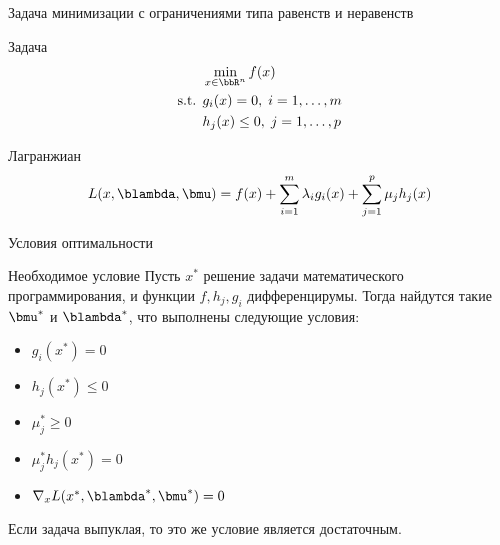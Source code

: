 \documentclass[12pt,russian]{beamer}
\begin{document}
\begin{frame}{{\small Задача минимизации с ограничениями типа равенств и неравенств}}

\begin{block}{Задача}
\vspace{-5mm}
\begin{equation*}
\begin{split}
& \min\limits_{x \in \bbR^n} f(x)\\
\text{s.t. } & g_i(x) = 0, \; i = 1,\ldots,m\\
& h_j(x) \leq 0, \; j = 1,\ldots, p
\end{split}
\end{equation*}
\end{block}

\begin{block}{Лагранжиан}
\begin{equation*}
L(x, \blambda, \bmu) = f(x) + \sum\limits_{i=1}^m\lambda_i g_i(x) + \sum\limits_{j=1}^p \mu_j h_j(x)
\end{equation*}
\end{block}
\end{frame}

\begin{frame}{Условия оптимальности}
\begin{block}{Необходимое условие}
Пусть $x^*$ решение задачи математического программирования, и функции $f, h_j, g_i$ дифференцирумы. 
Тогда найдутся такие $\bmu^*$ и $\blambda^*$, что выполнены следующие условия:
\begin{itemize}
\item $g_i(x^*) = 0$
\item $h_j(x^*) \leq 0$
\item $ \mu^*_j \geq 0$
\item $\mu^*_jh_j(x^*) = 0$
\item $\nabla_x L(x^*, \blambda^*, \bmu^*) = 0$
\end{itemize}
\end{block}
Если задача выпуклая, то это же условие является достаточным.
\end{frame}
\end{document}
